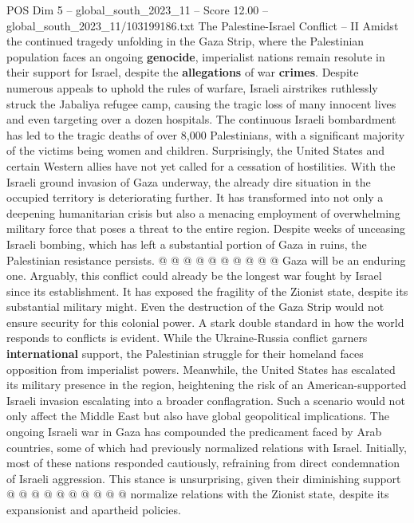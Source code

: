 \begin{textsample}{POS Dim 5 – global\_south\_2023\_11 – Score 12.00 – global\_south\_2023\_11/103199186.txt}  \label{ex:f5_pos_259}
The Palestine-Israel Conflict -- II Amidst the continued tragedy unfolding in the Gaza Strip, where the Palestinian population faces an ongoing \textbf{genocide}, imperialist nations remain resolute in their support for Israel, despite the \textbf{allegations} of war \textbf{crimes}.
Despite numerous appeals to uphold the rules of warfare, Israeli airstrikes ruthlessly struck the Jabaliya refugee camp, causing the tragic loss of many innocent lives and even targeting over a dozen hospitals.
The continuous Israeli bombardment has led to the tragic deaths of over 8,000 Palestinians, with a significant majority of the victims being women and children.
Surprisingly, the United States and certain Western allies have not yet called for a cessation of hostilities.
With the Israeli ground invasion of Gaza underway, the already dire situation in the occupied territory is deteriorating further.
It has transformed into not only a deepening humanitarian crisis but also a menacing employment of overwhelming military force that poses a threat to the entire region.
Despite weeks of unceasing Israeli bombing, which has left a substantial portion of Gaza in ruins, the Palestinian resistance persists. @ @ @ @ @ @ @ @ @ @ Gaza will be an enduring one.
Arguably, this conflict could already be the longest war fought by Israel since its establishment.
It has exposed the fragility of the Zionist state, despite its substantial military might.
Even the destruction of the Gaza Strip would not ensure security for this colonial power.
A stark double standard in how the world responds to conflicts is evident.
While the Ukraine-Russia conflict garners \textbf{international} support, the Palestinian struggle for their homeland faces opposition from imperialist powers.
Meanwhile, the United States has escalated its military presence in the region, heightening the risk of an American-supported Israeli invasion escalating into a broader conflagration.
Such a scenario would not only affect the Middle East but also have global geopolitical implications.
The ongoing Israeli war in Gaza has compounded the predicament faced by Arab countries, some of which had previously normalized relations with Israel.
Initially, most of these nations responded cautiously, refraining from direct condemnation of Israeli aggression.
This stance is unsurprising, given their diminishing support @ @ @ @ @ @ @ @ @ @ normalize relations with the Zionist state, despite its expansionist and apartheid policies.

\end{textsample}
